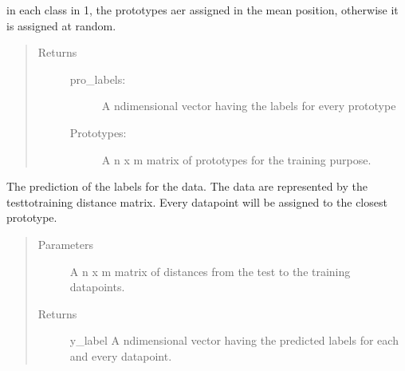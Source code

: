 \documentclass[letterpaper,10pt,english]{sphinxmanual}
\begin{document}
\begin{fulllineitems}
\begin{fulllineitems}
\begin{quote}
\begin{description}
\begin{itemize}
\end{itemize}

\end{description}\end{quote}

\sphinxAtStartPar
in each class in 1, the prototypes aer assigned in the mean position, otherwise it is assigned at random.
\begin{quote}\begin{description}
\item[{Returns}] \leavevmode
\sphinxAtStartPar
\begin{description}
\item[{pro\_labels:}] \leavevmode
\sphinxAtStartPar
A n\sphinxhyphen{}dimensional vector having the labels for every prototype

\item[{Prototypes:}] \leavevmode
\sphinxAtStartPar
A n x m matrix of prototypes for the training purpose.

\end{description}


\end{description}\end{quote}

\end{fulllineitems}


\begin{fulllineitems}
\label{\detokenize{Renyi_final:Renyi_final.GLVQ.data_predictor}}
\sphinxAtStartPar
The prediction of the labels for the data. The data are represented by the test\sphinxhyphen{}to\sphinxhyphen{}training distance matrix. Every
datapoint will be assigned to the closest prototype.
\begin{quote}\begin{description}
\item[{Parameters}] \leavevmode
\sphinxAtStartPar
{} \textendash{} A n x m matrix of distances from the test to the training datapoints.

\item[{Returns}] \leavevmode
\sphinxAtStartPar
y\_label \sphinxhyphen{} A n\sphinxhyphen{}dimensional vector having the predicted labels for each and every datapoint.


\end{description}
\end{quote}
\end{fulllineitems}
\end{fulllineitems}
\end{document}
